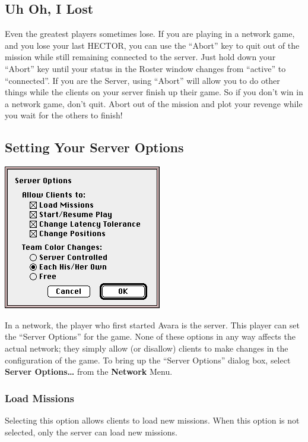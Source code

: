 \documentclass{article}
\begin{document}
\subsection{Uh Oh, I Lost}
Even the greatest players sometimes lose. If you are playing in a network game, and you lose your last HECTOR, you can use the ``Abort'' key to quit out of the mission while still remaining connected to the server. Just hold down your ``Abort'' key until your status in the Roster window changes from ``active'' to ``connected''. If you are the Server, using ``Abort'' will allow you to do other things while the clients on your server finish up their game. So if you don't win in a network game, don't quit. Abort out of the mission and plot your revenge while you wait for the others to finish!

\subsection{Setting Your Server Options}
\begin{center}
	\includegraphics{img/19.png}
\end{center}

In a network, the player who first started Avara is the server. This player can set the ``Server Options'' for the game. None of these options in any way affects the actual network; they simply allow (or disallow) clients to make changes in the configuration of the game. To bring up the ``Server Options'' dialog box, select \textbf{Server Options\dots} from the \textbf{Network} Menu.

\subsubsection{Load Missions}
Selecting this option allows clients to load new missions. When this option is not selected, only the server can load new missions.
\end{document}
